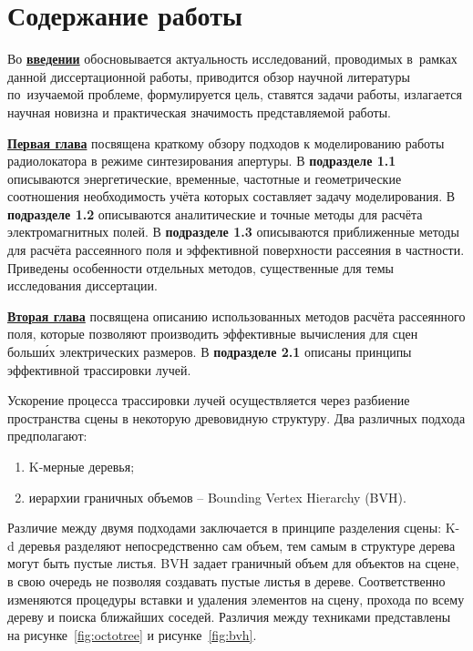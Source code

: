 \section*{Содержание работы}
Во \underline{\textbf{введении}} обосновывается актуальность
исследований, проводимых в~рамках данной диссертационной работы,
приводится обзор научной литературы по~изучаемой проблеме,
формулируется цель, ставятся задачи работы, излагается научная новизна
и практическая значимость представляемой работы.


\underline{\textbf{Первая глава}} посвящена краткому обзору подходов к
моделированию работы радиолокатора в режиме синтезирования апертуры.
В \textbf{подразделе 1.1} описываются энергетические, временные, частотные и
геометрические соотношения необходимость учёта которых составляет задачу
моделирования.
В \textbf{подразделе 1.2} описываются аналитические и точные методы для расчёта
электромагнитных полей.
В \textbf{подразделе 1.3} описываются приближенные методы для расчёта рассеянного поля
и эффективной поверхности рассеяния в частности.
Приведены особенности отдельных методов, существенные
для темы исследования диссертации.


\underline{\textbf{Вторая глава}} посвящена описанию использованных методов
расчёта рассеянного поля, которые позволяют производить эффективные
вычисления для сцен больш\'их электрических размеров.
В \textbf{подразделе 2.1} описаны принципы эффективной трассировки лучей.

Ускорение процесса трассировки лучей осуществляется через разбиение
пространства сцены в некоторую древовидную структуру. Два различных
подхода предполагают:
\begin{enumerate}
    \item
    K-мерные деревья;
    \item
    иерархии граничных объемов -- Bounding Vertex Hierarchy (BVH).
\end{enumerate}

Различие между двумя подходами заключается в принципе разделения сцены:
K-d деревья разделяют непосредственно сам объем, тем самым в структуре
дерева могут быть пустые листья. BVH задает граничный объем для объектов
на сцене, в свою очередь не позволяя создавать пустые листья в дереве.
Соответственно изменяются процедуры вставки и удаления элементов на
сцену, прохода по всему дереву и поиска ближайших соседей. Различия
между техниками представлены на рисунке~\ref{fig:octotree} и рисунке~\ref{fig:bvh}.

